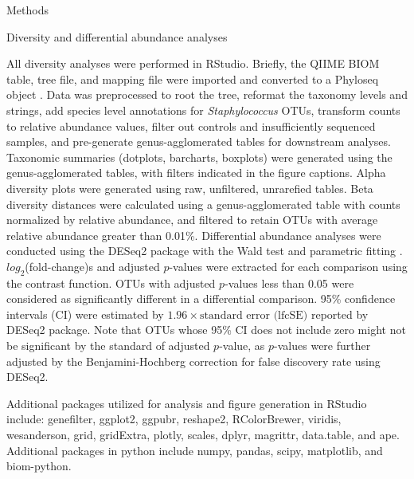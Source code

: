 \documentclass[oneside,12pt,final]{sty/ucthesis-CA2012}
\begin{document}
\begin{mainmatter}
\begin{section}{Methods}
\begin{subsection}{Diversity and differential abundance analyses}

All diversity analyses were performed in RStudio. Briefly, the QIIME BIOM table, tree file, and mapping file were imported and converted to a Phyloseq object \cite{RN45}. Data was preprocessed to root the tree, reformat the taxonomy levels and strings, add species level annotations for \textit{Staphylococcus} OTUs, transform counts to relative abundance values, filter out controls and insufficiently sequenced samples, and pre-generate genus-agglomerated tables for downstream analyses. Taxonomic summaries (dotplots, barcharts, boxplots) were generated using the genus-agglomerated tables, with filters indicated in the figure captions. Alpha diversity plots were generated using raw, unfiltered, unrarefied tables. Beta diversity distances were calculated using a genus-agglomerated table with counts normalized by relative abundance, and filtered to retain OTUs with average relative abundance greater than 0.01\%. Differential abundance analyses were conducted using the DESeq2 package with the Wald test and parametric fitting \cite{RN32}. $log_{2}$(fold-change)s and adjusted $p$-values were extracted for each comparison using the contrast function. OTUs with adjusted $p$-values less than 0.05 were considered as significantly different in a differential comparison. 95\% confidence intervals (CI) were estimated by $1.96 \times \text{standard error (lfcSE)}$ reported by DESeq2 package. Note that OTUs whose 95\% CI does not include zero might not be significant by the standard of adjusted $p$-value, as $p$-values were further adjusted by the Benjamini-Hochberg correction for false discovery rate using DESeq2.

Additional packages utilized for analysis and figure generation in RStudio include: genefilter, ggplot2, ggpubr, reshape2, RColorBrewer, viridis, wesanderson, grid, gridExtra, plotly, scales, dplyr, magrittr, data.table, and ape. Additional packages in python include numpy, pandas, scipy, matplotlib, and biom-python.
\end{subsection}


\end{section}
\end{mainmatter}
\end{document}
